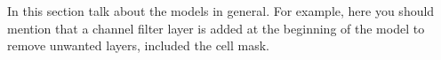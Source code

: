 
\glsresetall
\graphicspath{{./Sections/Methodology/Resources/}}

In this section talk about the models in general. For example, here you should mention that a channel filter layer is added at the beginning of the model to remove unwanted layers, included the cell mask.
